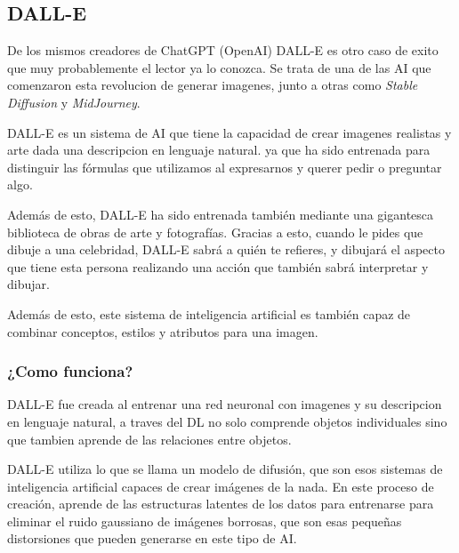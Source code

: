 \documentclass[runningheads]{llncs} %
\begin{document}

\newpage
\subsection{DALL-E}
De los mismos creadores de ChatGPT (OpenAI) DALL-E es otro caso de exito que muy
probablemente el lector ya lo conozca. Se trata  de una de las AI que comenzaron
esta revolucion de generar imagenes, junto a otras como \textit{Stable Diffusion}
y \textit{MidJourney}. \cite{dalle-xtaka}

DALL-E es un sistema de AI que tiene la capacidad de crear imagenes realistas y arte
dada una descripcion en lenguaje natural. ya que ha sido entrenada para distinguir 
las fórmulas que utilizamos al expresarnos y querer pedir o preguntar algo. \cite{ej-dalle}

Además de esto, DALL-E ha sido entrenada también mediante una gigantesca 
biblioteca de obras de arte y fotografías. Gracias a esto, 
cuando le pides que dibuje a una celebridad, DALL-E sabrá a quién te refieres, 
y dibujará el aspecto que tiene esta persona realizando una acción que también 
sabrá interpretar y dibujar. \cite{dalle-xtaka}

Además de esto, este sistema de inteligencia artificial es también capaz de combinar
conceptos, estilos y atributos para una imagen. 

\subsubsection{¿Como funciona?}
DALL-E fue creada al entrenar una red neuronal con imagenes y su descripcion en lenguaje
natural, a traves del DL no solo comprende objetos individuales sino que tambien aprende 
de las relaciones entre objetos. \cite{ej-dalle}

DALL-E utiliza lo que se llama un modelo de difusión, que son esos sistemas 
de inteligencia artificial capaces de crear imágenes de la nada. 
En este proceso de creación, aprende de las estructuras latentes de los datos 
para entrenarse para eliminar el ruido gaussiano de imágenes borrosas, 
que son esas pequeñas distorsiones que pueden generarse en este tipo de AI. 
\cite{dalle-xtaka}
\end{document}
